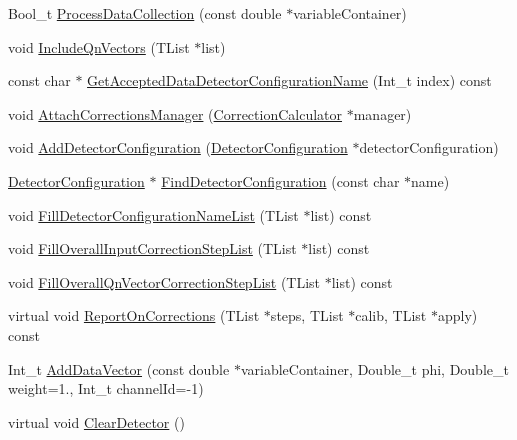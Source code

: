 \begin{DoxyCompactItemize}
\item 
Bool\+\_\+t \mbox{\hyperlink{classQn_1_1CorrectionDetector_a8415d9c428d7a168cc953da44b6a5e01}{Process\+Data\+Collection}} (const double $\ast$variable\+Container)
\item 
void \mbox{\hyperlink{classQn_1_1CorrectionDetector_a46b40b3743208bcf3cddd063690985e8}{Include\+Qn\+Vectors}} (T\+List $\ast$list)
\item 
const char $\ast$ \mbox{\hyperlink{classQn_1_1CorrectionDetector_a02acf1eeed47ab5eb2df84ae1de57b59}{Get\+Accepted\+Data\+Detector\+Configuration\+Name}} (Int\+\_\+t index) const
\item 
void \mbox{\hyperlink{classQn_1_1CorrectionDetector_a8de962ff8acbffdcfb15eba90a3a91ed}{Attach\+Corrections\+Manager}} (\mbox{\hyperlink{classQn_1_1CorrectionCalculator}{Correction\+Calculator}} $\ast$manager)
\item 
void \mbox{\hyperlink{classQn_1_1CorrectionDetector_a029dd33340f261a48a2c7fb32c599e7f}{Add\+Detector\+Configuration}} (\mbox{\hyperlink{classQn_1_1DetectorConfiguration}{Detector\+Configuration}} $\ast$detector\+Configuration)
\item 
\mbox{\hyperlink{classQn_1_1DetectorConfiguration}{Detector\+Configuration}} $\ast$ \mbox{\hyperlink{classQn_1_1CorrectionDetector_a5b4d3b18be6dd94a86e56d838c42ca80}{Find\+Detector\+Configuration}} (const char $\ast$name)
\item 
void \mbox{\hyperlink{classQn_1_1CorrectionDetector_a7605d01ec9abe6675b325d6ae2d710e9}{Fill\+Detector\+Configuration\+Name\+List}} (T\+List $\ast$list) const
\item 
void \mbox{\hyperlink{classQn_1_1CorrectionDetector_af4426ef9b524025c09e6f78a156b8f5d}{Fill\+Overall\+Input\+Correction\+Step\+List}} (T\+List $\ast$list) const
\item 
void \mbox{\hyperlink{classQn_1_1CorrectionDetector_a5a6b9787279e397b1682e72038acd3fe}{Fill\+Overall\+Qn\+Vector\+Correction\+Step\+List}} (T\+List $\ast$list) const
\item 
virtual void \mbox{\hyperlink{classQn_1_1CorrectionDetector_afbfcc072f1ba0d4b6c42a62daeb5a58e}{Report\+On\+Corrections}} (T\+List $\ast$steps, T\+List $\ast$calib, T\+List $\ast$apply) const
\item 
Int\+\_\+t \mbox{\hyperlink{classQn_1_1CorrectionDetector_a94328e4e2b21ac573c9f32d2d9a3e24a}{Add\+Data\+Vector}} (const double $\ast$variable\+Container, Double\+\_\+t phi, Double\+\_\+t weight=1., Int\+\_\+t channel\+Id=-\/1)
\item 
virtual void \mbox{\hyperlink{classQn_1_1CorrectionDetector_a9ff746e0a0128405bb37ffc0384fe114}{Clear\+Detector}} ()
\end{DoxyCompactItemize}


